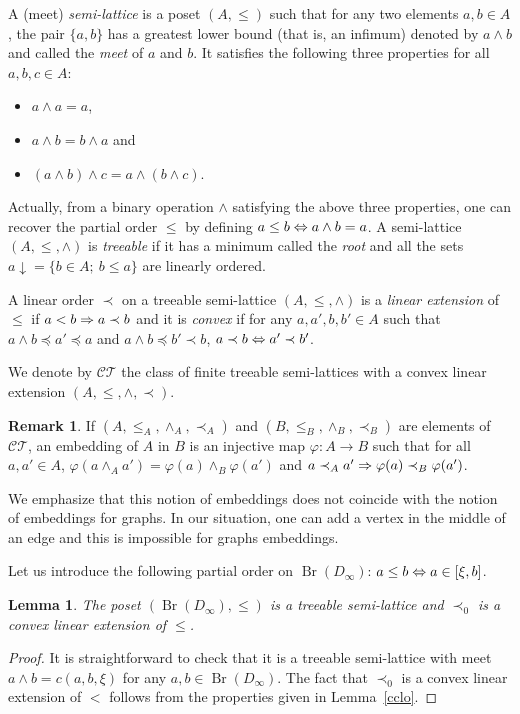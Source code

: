 \documentclass[JEP,XML,SOM,Unicode,NoFloatCountersInSection]{cedram}
\newcommand\implique{\mathchoice{\implies}{\Rightarrow}{\Rightarrow}{\Rightarrow}}
\newcommand\ssi{\mathchoice{\iff}{\Leftrightarrow}{\Leftrightarrow}{\Leftrightarrow}}
\let\mathcal\mathscr
\theoremstyle{plain}
\newtheorem{lem}[thm]{Lemma}
\theoremstyle{definition}
\newtheorem{rem}[thm]{Remark}
\newcommand{\cCT}{\mathcal{CT}}
\newcommand{\da}[1]{{#1\!\downarrow}}
\DeclareMathOperator{\Br}{Br}
\begin{document}
A (meet) \emph{semi-lattice} is a poset $(A,\leq)$ such that for any two elements $a,b\in A$, the pair $\{a,b\}$ has a greatest lower bound (that is, an infimum) denoted by $a\wedge b$ and called the \emph{meet} of $a$ and $b$. It satisfies the following three properties for all $a,b,c\in A$:
\begin{itemize}
\item $a\wedge a=a$,
\item $a\wedge b=b\wedge a$ and
\item $(a\wedge b)\wedge c=a\wedge(b\wedge c)$.
\end{itemize}
Actually, from a binary operation $\wedge$ satisfying the above three properties, one can recover the partial order $\leq$ by defining $a\leq b\ssi a\wedge b=a$.
A semi-lattice $(A,\leq,\wedge)$ is \emph{treeable} if it has a minimum called the \emph{root} and all the sets $\da a=\{b\in A;\ b\leq a\}$ are linearly ordered.

A linear order $\prec$ on a treeable semi-lattice $(A,\leq,\wedge)$ is a \emph{linear extension} of $\leq$ if $a< b\implique a\prec b$ and it is \emph{convex} if for any $a,a',b,b'\in A$ such that $a\wedge b\preceq a'\preceq a$ and $a\wedge b\preceq b'\prec b$, $a\prec b\ssi a'\prec b'$.

We denote by $\cCT$ the class of finite treeable semi-lattices with a convex linear extension $(A,\leq,\wedge,\prec)$.

\begin{rem} If $(A,\leq_A,\wedge_A,\prec_A)$ and $(B,\leq_B,\wedge_B,\prec_B)$ are elements of $\cCT$, an embedding of $A$ in $B$ is an injective map $\varphi\colon A\to B$ such that for all $a,a'\in A$, $\varphi(a\wedge_A a')=\varphi(a)\wedge_B\varphi(a')$ and $a\prec_A a'\implique \varphi(a)\prec_B\varphi(a')$.

We emphasize that this notion of embeddings does not coincide with the notion of embeddings for graphs. In our situation, one can add a vertex in the middle of an edge and this is impossible for graphs embeddings.
\end{rem}

Let us introduce the following partial order on $\Br(D_\infty)$: $a\leq b\ssi a\in[\xi,b]$.

\begin{lem}\label{lem:tr} The poset $(\Br(D_\infty),\leq)$ is a treeable semi-lattice and $\prec_0$ is a convex linear extension of $\leq$.
\end{lem}

\begin{proof} It is straightforward to check that it is a treeable semi-lattice with meet $a\wedge b=c(a,b,\xi)$ for any $a,b\in\Br(D_\infty)$. The fact that $\prec_0$ is a convex linear extension of $<$ follows from the properties given in Lemma~\ref{cclo}.
\end{proof}
\end{document}
